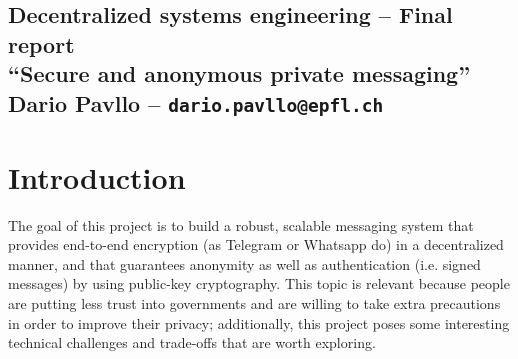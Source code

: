 \documentclass[a4paper,12pt]{article}
\title{}
\author{Dario Pavllo -- dario.pavllo@epfl.ch}
\date{} %
\begin{document}
{
\centering
\subsection*{Decentralized systems engineering -- Final report\\``Secure and anonymous private messaging''\\Dario Pavllo -- \texttt{dario.pavllo@epfl.ch}}}

\section{Introduction} %
The goal of this project is to build a robust, scalable messaging system that provides end-to-end encryption (as Telegram or Whatsapp do) in a decentralized manner, and that guarantees anonymity as well as authentication (i.e. signed messages) by using public-key cryptography. This topic is relevant because people are putting less trust into governments and are willing to take extra precautions in order to improve their privacy; additionally, this project poses some interesting technical challenges and trade-offs that are worth exploring.
\end{document}
